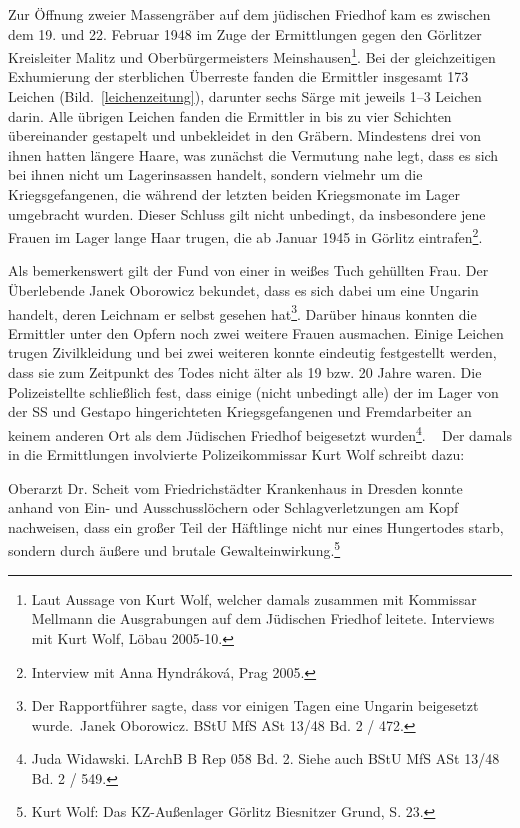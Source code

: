 \documentclass[a4paper,12pt,ngerman,
]{nisebook}
\begin{document}
\newline
Zur Öffnung zweier Massengräber auf dem jüdischen Friedhof kam es zwischen dem 19. und 22. Februar 1948 im Zuge der Ermittlungen gegen den Görlitzer Kreisleiter Malitz und Oberbürgermeisters Meinshausen\footnote{Laut Aussage von Kurt Wolf, welcher damals zusammen mit Kommissar Mellmann die Ausgrabungen auf dem Jüdischen Friedhof leitete. Interviews mit Kurt Wolf, Löbau 2005-10.}. 
Bei der gleichzeitigen Exhumierung der sterblichen Überreste fanden die Ermittler insgesamt 173 Leichen (Bild.~\ref{leichenzeitung}), darunter sechs Särge mit jeweils 1--3 Leichen darin. Alle übrigen Leichen fanden die Ermittler in bis zu vier Schichten übereinander gestapelt und unbekleidet in den Gräbern. Mindestens\label{weiss} drei von ihnen hatten längere Haare, was zunächst die Vermutung nahe legt, dass es sich bei ihnen nicht um Lagerinsassen handelt, sondern vielmehr um die Kriegsgefangenen, die während der letzten beiden Kriegsmonate im Lager umgebracht wurden. Dieser Schluss gilt nicht unbedingt, da insbesondere jene Frauen im Lager lange Haar trugen, die ab Januar 1945 in Görlitz eintrafen\footnote{Interview mit Anna Hyndr\'akov\'a, Prag 2005.}. 

Als bemerkenswert gilt der Fund von einer in weißes Tuch gehüllten Frau. Der Überlebende Janek Oborowicz bekundet, dass es sich dabei um eine Ungarin handelt, deren Leichnam er selbst gesehen hat\footnote{\glqq Der Rapportführer sagte, dass vor einigen Tagen eine Ungarin beigesetzt wurde.\grqq~Janek Oborowicz. BStU MfS ASt 13/48 Bd. 2 / 472.}. Darüber hinaus konnten die Ermittler unter den Opfern noch zwei weitere Frauen ausmachen. Einige Leichen trugen Zivilkleidung und bei zwei weiteren konnte eindeutig festgestellt werden, dass sie zum Zeitpunkt des Todes nicht älter als 19 bzw. 20 Jahre waren.
Die Polizei\linebreak\newpage stellte schließlich fest, dass einige (nicht unbedingt alle) der im Lager von der SS und Gestapo hingerichteten Kriegsgefangenen und Fremdarbeiter an keinem anderen Ort als dem Jüdischen Friedhof beigesetzt wurden\footnote{Juda Widawski. LArchB B Rep 058 Bd. 2. Siehe auch BStU MfS ASt 13/48 Bd. 2 / 549.}.
~\newline
Der damals in die Ermittlungen involvierte Polizeikommissar Kurt Wolf schreibt dazu:
\begin{leftbar}
Oberarzt Dr. Scheit vom Friedrichstädter Krankenhaus in Dresden konnte anhand von Ein- und Ausschusslöchern oder Schlagverletzungen am Kopf nachweisen, dass ein großer Teil der Häftlinge nicht nur eines Hungertodes starb, sondern durch äußere und brutale Gewalteinwirkung.\footnote{Kurt Wolf: Das KZ-Außenlager Görlitz Biesnitzer Grund, S. 23.}
\end{leftbar}
\end{document}

